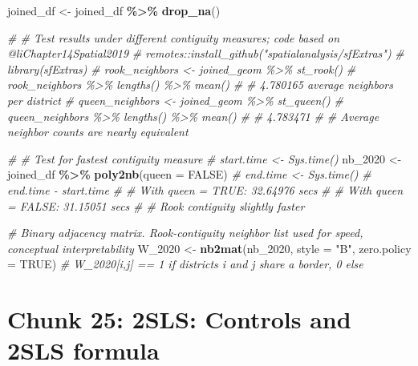 \documentclass[
]{article}
\newenvironment{Shaded}{\begin{snugshade}}{\end{snugshade}}
\newcommand{\AttributeTok}[1]{\textcolor[rgb]{0.13,0.29,0.53}{#1}}
\newcommand{\CommentTok}[1]{\textcolor[rgb]{0.56,0.35,0.01}{\textit{#1}}}
\newcommand{\ConstantTok}[1]{\textcolor[rgb]{0.56,0.35,0.01}{#1}}
\newcommand{\FunctionTok}[1]{\textcolor[rgb]{0.13,0.29,0.53}{\textbf{#1}}}
\newcommand{\NormalTok}[1]{#1}
\newcommand{\OtherTok}[1]{\textcolor[rgb]{0.56,0.35,0.01}{#1}}
\newcommand{\SpecialCharTok}[1]{\textcolor[rgb]{0.81,0.36,0.00}{\textbf{#1}}}
\newcommand{\StringTok}[1]{\textcolor[rgb]{0.31,0.60,0.02}{#1}}
\begin{document}
\begin{Shaded}
\begin{Highlighting}[]
\NormalTok{joined\_df }\OtherTok{\textless{}{-}}\NormalTok{ joined\_df }\SpecialCharTok{\%\textgreater{}\%} \FunctionTok{drop\_na}\NormalTok{()}

\CommentTok{\# \# Test results under different contiguity measures; code based on @liChapter14Spatial2019}
\CommentTok{\# remotes::install\_github("spatialanalysis/sfExtras")}
\CommentTok{\# library(sfExtras)}
\CommentTok{\# rook\_neighbors \textless{}{-} joined\_geom \%\textgreater{}\% st\_rook()}
\CommentTok{\# rook\_neighbors \%\textgreater{}\% lengths() \%\textgreater{}\% mean()}
\CommentTok{\# \# 4.780165 average neighbors per district}
\CommentTok{\# queen\_neighbors \textless{}{-} joined\_geom \%\textgreater{}\% st\_queen()}
\CommentTok{\# queen\_neighbors \%\textgreater{}\% lengths() \%\textgreater{}\% mean()}
\CommentTok{\# \# 4.783471}
\CommentTok{\# \# Average neighbor counts are nearly equivalent}

\CommentTok{\# \# Test for fastest contiguity measure}
\CommentTok{\# start.time \textless{}{-} Sys.time()}
\NormalTok{nb\_2020 }\OtherTok{\textless{}{-}}\NormalTok{ joined\_df }\SpecialCharTok{\%\textgreater{}\%}  
  \FunctionTok{poly2nb}\NormalTok{(}\AttributeTok{queen =} \ConstantTok{FALSE}\NormalTok{)}
\CommentTok{\# end.time \textless{}{-} Sys.time()}
\CommentTok{\# end.time {-} start.time}
\CommentTok{\# \# With queen = TRUE: 32.64976 secs}
\CommentTok{\# \# With queen = FALSE: 31.15051 secs}
\CommentTok{\# \# Rook contiguity slightly faster}

\CommentTok{\# Binary adjacency matrix. Rook{-}contiguity neighbor list used for speed, conceptual interpretability}
\NormalTok{W\_2020 }\OtherTok{\textless{}{-}} \FunctionTok{nb2mat}\NormalTok{(nb\_2020, }\AttributeTok{style =} \StringTok{"B"}\NormalTok{, }\AttributeTok{zero.policy =} \ConstantTok{TRUE}\NormalTok{) }
\CommentTok{\# W\_2020[i,j] == 1 if districts i and j share a border, 0 else}
\end{Highlighting}
\end{Shaded}

\section*{Chunk 25: 2SLS: Controls and 2SLS formula}\label{chunk-25-2sls-controls-and-2sls-formula}
\end{document}
